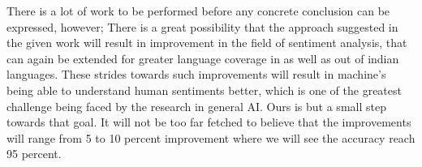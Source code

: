 \documentclass[12pt]{article}
\begin{document}
\fontsize{12}{20}\selectfont There is a lot of work to be performed before any concrete conclusion can be
expressed, however; There is a great possibility that the approach suggested in
the given work will result in improvement in the field of sentiment analysis,
that can again be extended for greater language coverage in as well as out of
indian languages. These strides towards such improvements will result in
machine's being able to understand human sentiments better, which is one of the
greatest challenge being faced by the research in general AI. Ours is but a
small step towards that goal. It will not be too far fetched to believe that
the improvements will range from 5 to 10 percent improvement where we will see
the accuracy reach 95 percent. \\



\printbibliography
\end{document}
